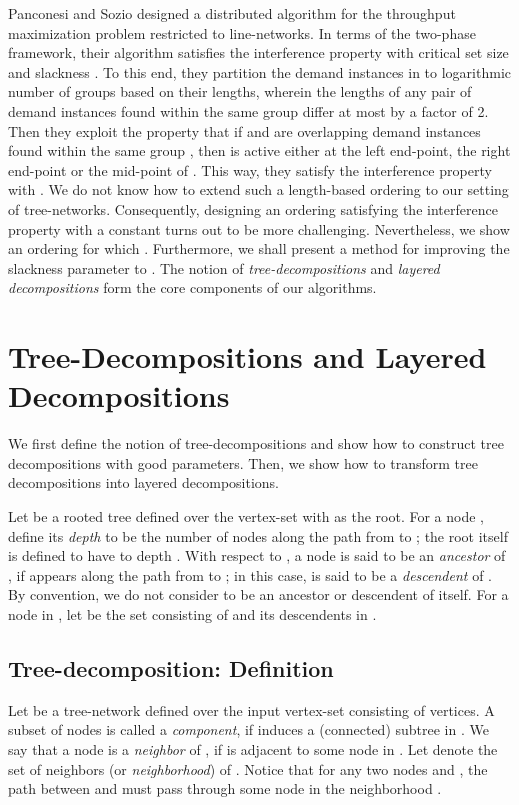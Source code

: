 \documentclass[11pt]{article}
\begin{document}
Panconesi and Sozio \cite{Pancj} designed a distributed algorithm for the 
throughput maximization problem restricted to line-networks.
In terms of the two-phase framework, their algorithm satisfies the interference property
with critical set size  and slackness .
To this end, they partition the demand instances in to logarithmic number of groups
based on their lengths, wherein the lengths of any pair of demand instances found within the same group 
differ at most by a factor of 2. Then they exploit the property that if  and 
are overlapping demand instances found within the same group , 
then  is active either at the left end-point, the right end-point or the mid-point of .
This way, they satisfy the interference property with .
We do not know how to extend such a length-based ordering to our setting of tree-networks.
Consequently, designing an ordering satisfying the interference property with a constant  
turns out to be more challenging. Nevertheless, we show an ordering for which .
Furthermore, we shall present a method for improving the slackness parameter  to .
The notion of {\em tree-decompositions} and {\em layered decompositions} form the core components
of our algorithms.

\section{Tree-Decompositions and Layered Decompositions}
We first define the notion of tree-decompositions and show how to
construct tree decompositions with good parameters. 
Then, we show how to transform tree decompositions into layered decompositions.

Let  be a rooted tree defined over the vertex-set  with  as the root.
For a node , define its {\em depth} to be the number
of nodes along the path from  to ; the root  itself is defined to have to depth .
With respect to , a node  is said to be an {\em ancestor} of ,
if  appears along the path from  to ; in this case,  is said to be a {\em descendent} of .
By convention, we do not consider  to be an ancestor or descendent of itself.
For a node  in , let  be the set consisting of  and its descendents in .

\subsection{Tree-decomposition: Definition}
Let  be a tree-network defined over the input vertex-set  consisting of  vertices.
A subset of nodes  is called a {\em component}, if  induces a (connected) subtree in .
We say that a node  is a {\em neighbor} of , if  is adjacent to some node in .
Let  denote the set of neighbors (or {\em neighborhood}) of .
Notice that for any two nodes  and , the path between  and  must pass through 
some node in the neighborhood .
\end{document}
